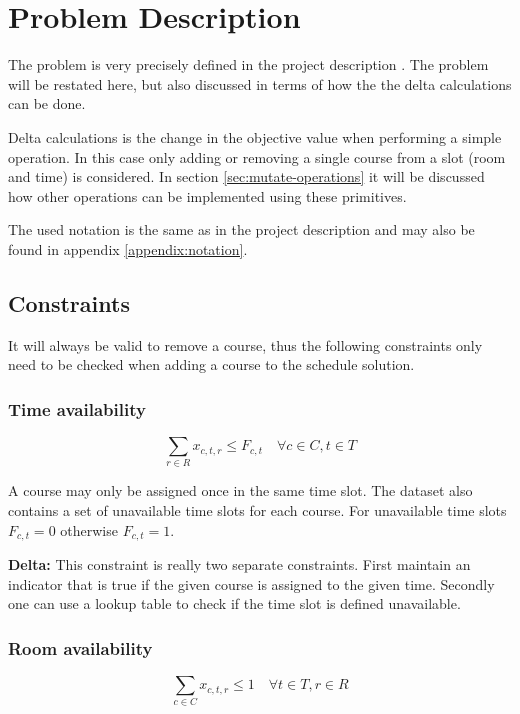 \section{Problem Description}

The problem is very precisely defined in the project description \cite{assignment}. The problem will be restated here, but also discussed in terms of how the the delta calculations can be done.

Delta calculations is the change in the objective value when performing a simple operation. In this case only adding or removing a single course from a slot (room and time) is considered. In section \ref{sec:mutate-operations} it will be discussed how other operations can be implemented using these primitives.

The used notation is the same as in the project description \cite{assignment} and may also be found in appendix \ref{appendix:notation}.

\subsection{Constraints}
\label{sec:problem-constraints}

It will always be valid to remove a course, thus the following constraints only need to be checked when adding a course to the schedule solution.

\subsubsection{Time availability}
\begin{equation}
    \sum_{r \in R} x_{c, t, r} \le F_{c, t} \quad \forall c \in C, t \in T
\end{equation}

A course may only be assigned once in the same time slot. The dataset also contains a set of unavailable time slots for each course. For unavailable time slots $F_{c, t} = 0$ otherwise $F_{c, t} = 1$.

\textbf{Delta:} This constraint is really two separate constraints. First maintain an indicator that is true if the given course is assigned to the given time. Secondly one can use a lookup table to check if the time slot is defined unavailable.

\subsubsection{Room availability}
\begin{equation}
    \sum_{c \in C} x_{c, t, r} \le 1 \quad \forall t \in T, r \in R
\end{equation}

